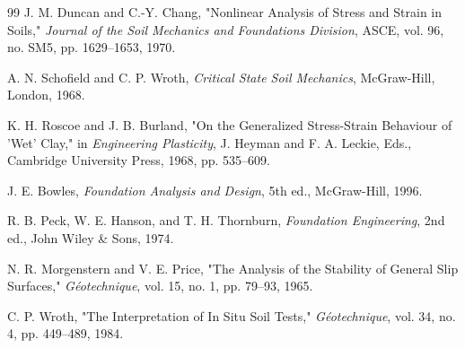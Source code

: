 \documentclass[11pt,a4paper]{article}
\begin{document}
\begin{thebibliography}{99}
J. M. Duncan and C.-Y. Chang, "Nonlinear Analysis of Stress and Strain in Soils," \textit{Journal of the Soil Mechanics and Foundations Division}, ASCE, vol. 96, no. SM5, pp. 1629--1653, 1970.

A. N. Schofield and C. P. Wroth, \textit{Critical State Soil Mechanics}, McGraw-Hill, London, 1968.

K. H. Roscoe and J. B. Burland, "On the Generalized Stress-Strain Behaviour of 'Wet' Clay," in \textit{Engineering Plasticity}, J. Heyman and F. A. Leckie, Eds., Cambridge University Press, 1968, pp. 535--609.

J. E. Bowles, \textit{Foundation Analysis and Design}, 5th ed., McGraw-Hill, 1996.

R. B. Peck, W. E. Hanson, and T. H. Thornburn, \textit{Foundation Engineering}, 2nd ed., John Wiley \& Sons, 1974.

N. R. Morgenstern and V. E. Price, "The Analysis of the Stability of General Slip Surfaces," \textit{Géotechnique}, vol. 15, no. 1, pp. 79--93, 1965.

C. P. Wroth, "The Interpretation of In Situ Soil Tests," \textit{Géotechnique}, vol. 34, no. 4, pp. 449--489, 1984.

\end{thebibliography}
\end{document}
